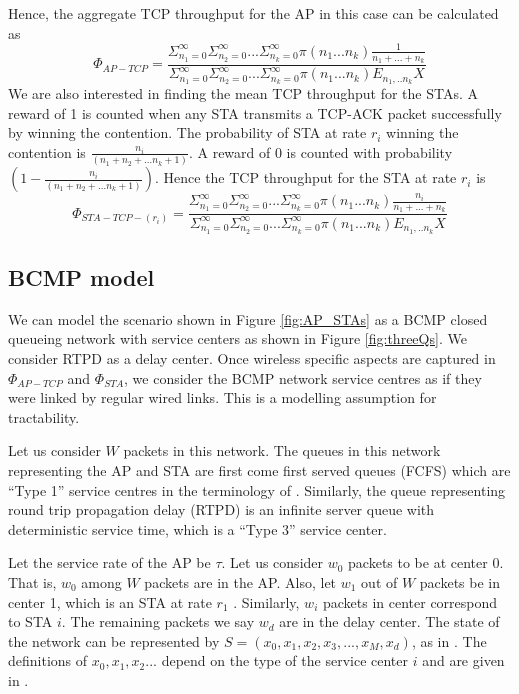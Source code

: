 \documentclass[conference]{IEEEtran}
\begin{document}
Hence, the aggregate TCP throughput for the AP in this case can be 
calculated as\\
\begin{equation}	
 \Phi_{AP-TCP} = \frac{\Sigma^{\infty}_{n_1 =0} \Sigma^{\infty}_{n_2 =0} ... 
 \Sigma^{\infty}_{n_k =0} \pi (n_1... n_k)\frac{1}{n_1+...+n_k} 
}{\Sigma^{\infty}_{n_1 =0} \Sigma^{\infty}_{n_2 =0} ... \Sigma^{\infty}_{n_k 
=0}  \pi (n_1... n_k)  E_{n_1,..n_k}X}  
\label{eq:ap_thpt}
\end{equation}
We are also interested in finding the mean TCP throughput for the STAs. A
reward of 1 is counted when any STA transmits a TCP-ACK packet successfully by
winning the contention. The probability of STA at rate $r_i$ winning the
contention is $ \frac{n_i}{(n_1 + n_2 + ... n_k + 1)}$. A reward of 0 is
counted with probability $ ( 1- \frac{n_i}{(n_1 + n_2+ ... n_k + 1)} )$.
Hence the TCP throughput for the STA at rate $r_i$ is\\
\begin{equation}	
 \Phi_{STA-TCP-(r_i)} = \frac{\Sigma^{\infty}_{n_1 =0} \Sigma^{\infty}_{n_2 =0} ... 
 \Sigma^{\infty}_{n_k =0} \pi (n_1... n_k)\frac{n_i}{n_1+...+n_k} 
}{\Sigma^{\infty}_{n_1 =0} \Sigma^{\infty}_{n_2 =0} ... \Sigma^{\infty}_{n_k 
=0}  \pi (n_1... n_k)  E_{n_1,..n_k}X}  
\label{eq:sta_thpt}
\end{equation}


\subsection{BCMP model}
We can model the scenario shown in Figure \ref{fig:AP_STAs} as a BCMP closed
queueing network \cite{astn_model:bcmp} with service centers as shown in Figure 
\ref{fig:threeQs}. We consider RTPD as a delay center. Once wireless specific 
aspects are captured in $ \Phi_{AP-TCP}$ and $\Phi_{STA}$,
we consider the BCMP network service centres as if they were linked
by regular wired links. This is a modelling assumption for tractability.

Let us consider $ W $ packets in this network. The queues in this network 
representing the AP and STA are first come first served queues (FCFS) which 
are ``Type 1'' service centres in the terminology of \cite{astn_model:bcmp}. 
Similarly, the queue representing round trip propagation delay (RTPD) is an 
infinite server queue with deterministic service time, which is a ``Type 3'' service center.

Let the service rate of the AP be $ \tau $. Let us consider $ w_0 $ packets to
be at center 0. That is, $ w_0 $ among $ W $ packets are in the AP. Also, let 
$ w_1 $ out of $ W $ packets be in center 1, which is an STA at rate $r_1$ .
Similarly, $ w_i $ packets in center correspond to STA $i$. The remaining 
packets we say $w_d$ are in the delay center. The state of the network 
can be represented by $ S = ( x_0, x_1, x_2, x_3,..., x_M, x_d ) $,
as in \cite{astn_model:bcmp}. The definitions of $ x_0, x_1, x_2 ...$ depend on the type of the service center $i$  and are given in \cite{astn_model:bcmp}.
\end{document}
